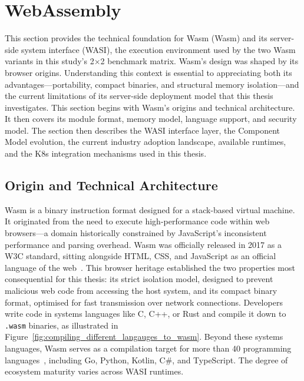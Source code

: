 \section{WebAssembly}
\label{sec:wasm}

This section provides the technical foundation for \acl{Wasm} (\acs{Wasm}) and its server-side system interface (\acs{WASI}), the execution environment used by the two \acs{Wasm} variants in this study's 2$\times$2 benchmark matrix. \acs{Wasm}'s design was shaped by its browser origins. Understanding this context is essential to appreciating both its advantages---portability, compact binaries, and structural memory isolation---and the current limitations of its server-side deployment model that this thesis investigates. This section begins with \acs{Wasm}'s origins and technical architecture. It then covers its module format, memory model, language support, and security model. The section then describes the \acs{WASI} interface layer, the Component Model evolution, the current industry adoption landscape, available runtimes, and the \acs{K8s} integration mechanisms used in this thesis.

\subsection{Origin and Technical Architecture}
\begin{sloppypar}
\acs{Wasm} is a binary instruction format designed for a stack-based virtual machine. It originated from the need to execute high-performance code within web browsers---a domain historically constrained by JavaScript's inconsistent performance and parsing overhead. \acs{Wasm} was officially released in 2017 as a \ac{W3C} standard, sitting alongside \ac{HTML}, \ac{CSS}, and JavaScript as an official language of the web~\cite{haas2017bringing}. This browser heritage established the two properties most consequential for this thesis: its strict isolation model, designed to prevent malicious web code from accessing the host system, and its compact binary format, optimised for fast transmission over network connections. Developers write code in systems languages like C, C++, or Rust and compile it down to \texttt{.wasm} binaries, as illustrated in Figure~\ref{fig:compiling_different_langauges_to_wasm}. Beyond these systems languages, \acs{Wasm} serves as a compilation target for more than 40 programming languages~\cite{fermyon2024langmatrix}, including Go, Python, Kotlin, C\#, and TypeScript. The degree of ecosystem maturity varies across \acs{WASI} runtimes.
\end{sloppypar}


